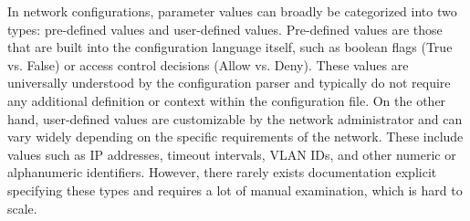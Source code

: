 In network configurations, parameter values can broadly be categorized into two types: pre-defined values and user-defined values. Pre-defined values are those that are built into the configuration language itself, such as boolean flags (True vs. False) or access control decisions (Allow vs. Deny). These values are universally understood by the configuration parser and typically do not require any additional definition or context within the configuration file. On the other hand, user-defined values are customizable by the network administrator and can vary widely depending on the specific requirements of the network. These include values such as IP addresses, timeout intervals, VLAN IDs, and other numeric or alphanumeric identifiers. However, there rarely exists documentation explicit specifying these types and requires a lot of manual examination, which is hard to scale.

